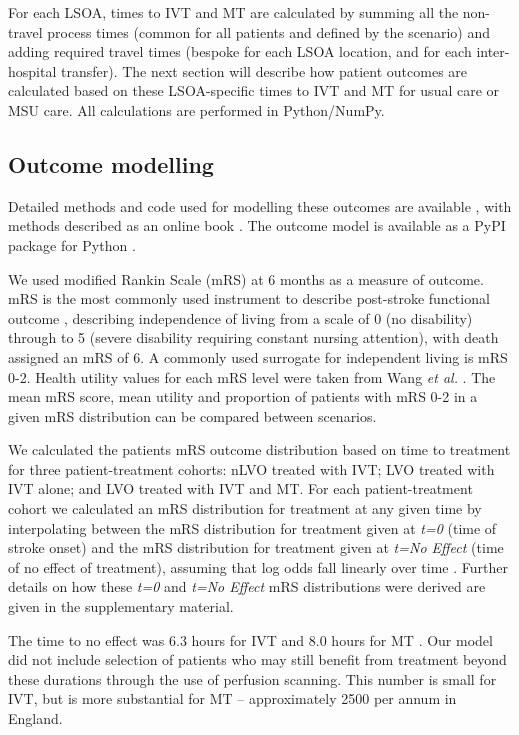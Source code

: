 For each LSOA, times to IVT and MT are calculated by summing all the non-travel process times (common for all patients and defined by the scenario) and adding required travel times (bespoke for each LSOA location, and for each inter-hospital transfer). The next section will describe how patient outcomes are calculated based on these LSOA-specific times to IVT and MT for usual care or MSU care. All calculations are performed in Python/NumPy.

\subsection{Outcome modelling}

Detailed methods and code used for modelling these outcomes are available \cite{github2}, with methods described as an online book \cite{github3}. The outcome model is available as a PyPI package for Python \cite{pypi}.

We used modified Rankin Scale (mRS) at 6 months as a measure of outcome. mRS is the most commonly used instrument to describe post-stroke functional outcome \cite{quinn_functional_2009}, describing independence of living from a scale of 0 (no disability) through to 5 (severe disability requiring constant nursing attention), with death assigned an mRS of 6. A commonly used surrogate for independent living is  mRS 0-2. Health utility values for each mRS level were taken from Wang \textit{et al.} \cite{wang_utility-weighted_2020}. The mean mRS score, mean utility and proportion of patients with mRS 0-2 in a given mRS distribution can be compared between scenarios.

We calculated the patients mRS outcome distribution based on time to treatment for three patient-treatment cohorts: nLVO treated with IVT; LVO treated with IVT alone; and LVO treated with IVT and MT. For each patient-treatment cohort we calculated an mRS distribution for treatment at any given time by interpolating between the mRS distribution for treatment given at \emph{t=0} (time of stroke onset) and the mRS distribution for treatment given at \emph{t=No Effect} (time of no effect of treatment), assuming that log odds fall linearly over time \cite{emberson_effect_2014, fransen_time_2016}. Further details on how these \emph{t=0} and \emph{t=No Effect} mRS distributions were derived are given in the supplementary material.

The time to no effect was 6.3 hours for IVT \cite{emberson_effect_2014} and 8.0 hours for MT \cite{ fransen_time_2016}. Our model did not include selection of patients who may still benefit from treatment beyond these durations through the use of perfusion scanning. This number is small for IVT, but is more substantial for MT – approximately 2500 per annum in England. 

